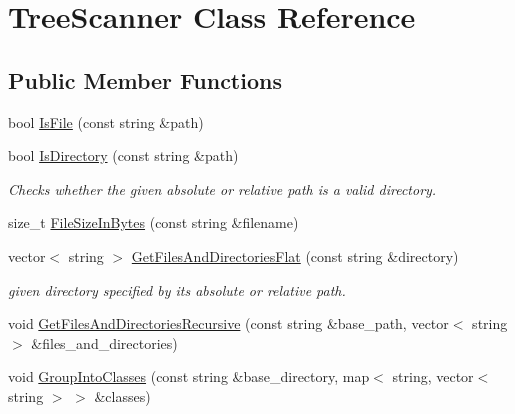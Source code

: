 \hypertarget{class_tree_scanner}{\section{Tree\-Scanner Class Reference}
\label{class_tree_scanner}
}
\subsection*{Public Member Functions}
\begin{DoxyCompactItemize}
\item 
bool \hyperlink{class_tree_scanner_ae00aada3fc132df9c016b929cf28c9bc}{Is\-File} (const string \&path)
\item 
\hypertarget{class_tree_scanner_aa7b2ea3b785abfeb7947fdd74ce64953}{bool \hyperlink{class_tree_scanner_aa7b2ea3b785abfeb7947fdd74ce64953}{Is\-Directory} (const string \&path)}\label{class_tree_scanner_aa7b2ea3b785abfeb7947fdd74ce64953}

\begin{DoxyCompactList}\small\item\em Checks whether the given absolute or relative path is a valid directory. \end{DoxyCompactList}\item 
size\-\_\-t \hyperlink{class_tree_scanner_af9f6d985cb42d2cd7505b1213edd04b8}{File\-Size\-In\-Bytes} (const string \&filename)
\item 
vector$<$ string $>$ \hyperlink{class_tree_scanner_a1ad8ab7b22690ae99f25e9b26ab31f6d}{Get\-Files\-And\-Directories\-Flat} (const string \&directory)
\begin{DoxyCompactList}\small\item\em given directory specified by its absolute or relative path. \end{DoxyCompactList}\item 
void \hyperlink{class_tree_scanner_a042ddf3be0d3960dbca0362fb52cd1cd}{Get\-Files\-And\-Directories\-Recursive} (const string \&base\-\_\-path, vector$<$ string $>$ \&files\-\_\-and\-\_\-directories)
\item 
void \hyperlink{class_tree_scanner_add67141b6bca7a3abc72ea305ac915bd}{Group\-Into\-Classes} (const string \&base\-\_\-directory, map$<$ string, vector$<$ string $>$ $>$ \&classes)
\end{DoxyCompactItemize}


